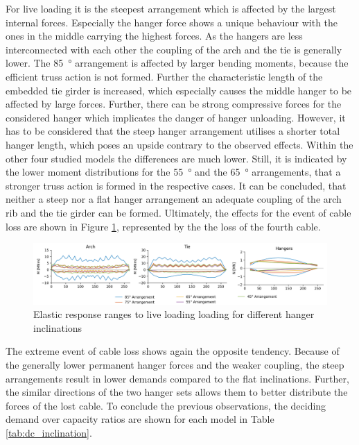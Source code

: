 For live loading it is the steepest arrangement which is affected by the largest internal forces. Especially the hanger force shows a unique behaviour with the ones in the middle carrying the highest forces. As the hangers are less interconnected with each other the coupling of the arch and the tie is generally lower. The \SI{85}{\degree} arrangement is affected by larger bending moments, because the efficient truss action is not formed. Further the characteristic length of the embedded tie girder is increased, which especially causes the middle hanger to be affected by large forces. Further, there can be strong compressive forces for the considered hanger which implicates the danger of hanger unloading. However, it has to be considered that the steep hanger arrangement utilises a shorter total hanger length, which poses an upside contrary to the observed effects. Within the other four studied models the differences are much lower. Still, it is indicated by the lower moment distributions for the \SI{55}{\degree} and the \SI{65}{\degree} arrangements, that a stronger truss action is formed in the respective cases. It can be concluded, that neither a steep nor a flat hanger arrangement an adequate coupling of the arch rib and the tie girder can be formed. 
Ultimately, the effects for the event of cable loss are shown in Figure \ref{fig:inclination_cable}, represented by the the loss of the fourth cable.

\begin{figure}[H]
    \centering
    \includegraphics[trim={1cm 0 13cm 0},clip, width=\textwidth]{calculations/parallel arrangement comparison/live loading_plot.png}
    \caption{Elastic response ranges to live loading loading for different hanger inclinations}
    \label{fig:inclination_cable}
\end{figure}

The extreme event of cable loss shows again the opposite tendency. Because of the generally lower permanent hanger forces and the weaker coupling, the steep arrangements result in lower demands compared to the flat inclinations. Further, the similar directions of the two hanger sets allows them to better distribute the forces of the lost cable. To conclude the previous observations, the deciding demand over capacity ratios are shown for each model in Table \ref{tab:dc_inclination}.

